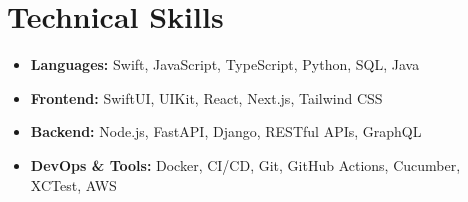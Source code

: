 \documentclass[10pt,letterpaper]{article}
\begin{document}
\section{Technical Skills}

\vspace{0.4em}

\vspace{0.4em}
{\small
\begin{itemize}
  \item \textbf{Languages:} Swift, JavaScript, TypeScript, Python, SQL, Java
  \item \textbf{Frontend:} SwiftUI, UIKit, React, Next.js, Tailwind CSS
  \item \textbf{Backend:} Node.js, FastAPI, Django, RESTful APIs, GraphQL
  \item \textbf{DevOps \& Tools:} Docker, CI/CD, Git, GitHub Actions, Cucumber, XCTest, AWS
\end{itemize}
}
\end{document}
